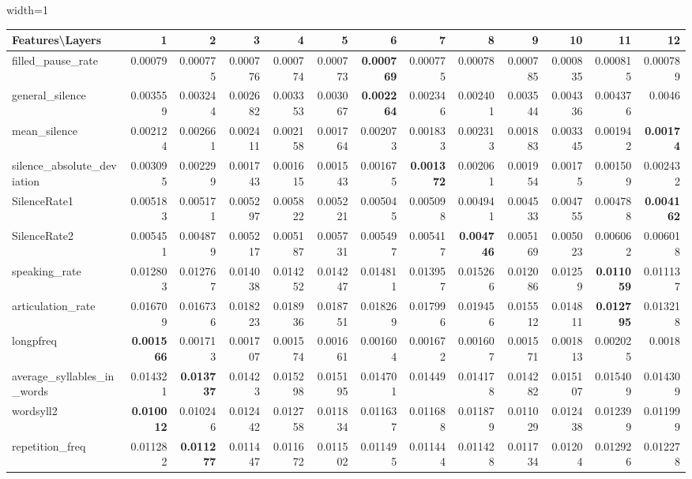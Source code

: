 \documentclass[sigconf]{acmart}
\newcommand{\mj}{Mockingjay\xspace}
\begin{document}
\begin{table*}[]
\begin{adjustbox}{width=1\textwidth}
\begin{tabular}{@{}l|rrrrrrrrrrrr@{}}
\toprule
\textbf{Features\textbackslash{}Layers} & 1 & 2 & 3 & 4 & 5 & 6 & 7 & 8 & 9 & 10 & 11 & 12 \\ \midrule
filled\_pause\_rate & 0.00079 & 0.000775 & 0.000776 & 0.000774 & 0.000773 & \textbf{0.000769} & 0.000775 & 0.00078 & 0.000785 & 0.000835 & 0.000815 & 0.000789 \\
general\_silence & 0.003559 & 0.003244 & 0.002682 & 0.003353 & 0.003067 & \textbf{0.002264} & 0.002346 & 0.002401 & 0.003544 & 0.004336 & 0.004376 & 0.0046 \\
mean\_silence & 0.002124 & 0.002661 & 0.002411 & 0.002158 & 0.001764 & 0.002073 & 0.001833 & 0.002313 & 0.001883 & 0.003345 & 0.001942 & \textbf{0.00174} \\
silence\_absolute\_deviation & 0.003095 & 0.002299 & 0.001743 & 0.001615 & 0.001543 & 0.001675 & \textbf{0.001372} & 0.002061 & 0.001954 & 0.00175 & 0.001509 & 0.002432 \\
SilenceRate1 & 0.005183 & 0.005171 & 0.005297 & 0.005822 & 0.005221 & 0.005045 & 0.005098 & 0.004941 & 0.004533 & 0.004755 & 0.004788 & \textbf{0.004162} \\
SilenceRate2 & 0.005451 & 0.004879 & 0.005217 & 0.005187 & 0.005731 & 0.005497 & 0.005417 & \textbf{0.004746} & 0.005169 & 0.005023 & 0.006062 & 0.006018 \\
speaking\_rate & 0.012803 & 0.012767 & 0.014038 & 0.014252 & 0.014247 & 0.014811 & 0.013957 & 0.015266 & 0.012086 & 0.01259 & \textbf{0.011059} & 0.011137 \\
articulation\_rate & 0.016709 & 0.016736 & 0.018223 & 0.018936 & 0.018751 & 0.018269 & 0.017996 & 0.019456 & 0.015512 & 0.014811 & \textbf{0.012795} & 0.013218 \\
longpfreq & \textbf{0.001566} & 0.001713 & 0.001707 & 0.001574 & 0.001661 & 0.001604 & 0.001672 & 0.001607 & 0.001571 & 0.001813 & 0.002025 & 0.0018 \\
average\_syllables\_in\_words & 0.014321 & \textbf{0.013737} & 0.01423 & 0.015298 & 0.015195 & 0.014701 & 0.01449 & 0.014178 & 0.014282 & 0.015107 & 0.015409 & 0.014309 \\
wordsyll2 & \textbf{0.010012} & 0.010246 & 0.012442 & 0.012758 & 0.011834 & 0.011637 & 0.011688 & 0.011879 & 0.011029 & 0.012438 & 0.012399 & 0.011999 \\
repetition\_freq & 0.011282 & \textbf{0.011277} & 0.011447 & 0.011672 & 0.011502 & 0.011495 & 0.011444 & 0.011428 & 0.011734 & 0.01204 & 0.012926 & 0.012278\\ \bottomrule
\end{tabular}
\end{adjustbox}
\vspace{1 mm}
\caption{\label{Fluency_M}  \small Results (MSE) for fluency features on {\mj} for native read speech corpus (Librispeech)}

\end{table*}
\end{document}
